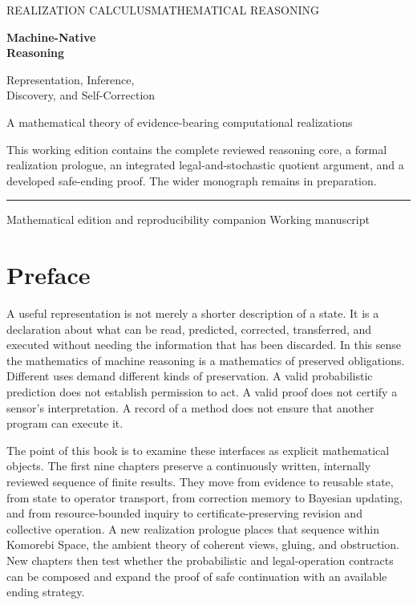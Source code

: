 \documentclass[11pt,oneside,openany]{book}
\theoremstyle{definition}\newtheorem{definition}[theorem]{Definition}
\begin{document}
\frontmatter
\hypersetup{pageanchor=false}
\begin{titlepage}
\thispagestyle{empty}
{\small\scshape REALIZATION CALCULUS\hfill MATHEMATICAL REASONING}\par
\vspace{1.1in}
{\color{Ink}\fontsize{34}{39}\selectfont\bfseries Machine-Native\\[3mm]Reasoning\par}
\vspace{0.30in}
{\fontsize{19}{25}\selectfont Representation, Inference,\\ Discovery, and Self-Correction\par}
\vspace{0.38in}{\color{Accent}\rule{1.9in}{2pt}}\par
\vspace{0.45in}{\Large Komorebi P.\par}
\vfill
{\large A mathematical theory of evidence-bearing computational realizations}\par
\vspace{0.22in}
This working edition contains the complete reviewed reasoning core, a formal realization prologue, an integrated legal-and-stochastic quotient argument, and a developed safe-ending proof. The wider monograph remains in preparation.\par
\vspace{0.65in}
{\color{Ink}\rule{\linewidth}{0.7pt}}\par
{\small Mathematical edition and reproducibility companion \hfill Working manuscript}
\end{titlepage}
\hypersetup{pageanchor=true}

\chapter*{Preface}
A useful representation is not merely a shorter description of a state. It is a declaration about what can be read, predicted, corrected, transferred, and executed without needing the information that has been discarded. In this sense the mathematics of machine reasoning is a mathematics of preserved obligations. Different uses demand different kinds of preservation. A valid probabilistic prediction does not establish permission to act. A valid proof does not certify a sensor's interpretation. A record of a method does not ensure that another program can execute it.

The point of this book is to examine these interfaces as explicit mathematical objects. The first nine chapters preserve a continuously written, internally reviewed sequence of finite results. They move from evidence to reusable state, from state to operator transport, from correction memory to Bayesian updating, and from resource-bounded inquiry to certificate-preserving revision and collective operation. A new realization prologue places that sequence within Komorebi Space, the ambient theory of coherent views, gluing, and obstruction. New chapters then test whether the probabilistic and legal-operation contracts can be composed and expand the proof of safe continuation with an available ending strategy.
\end{document}
